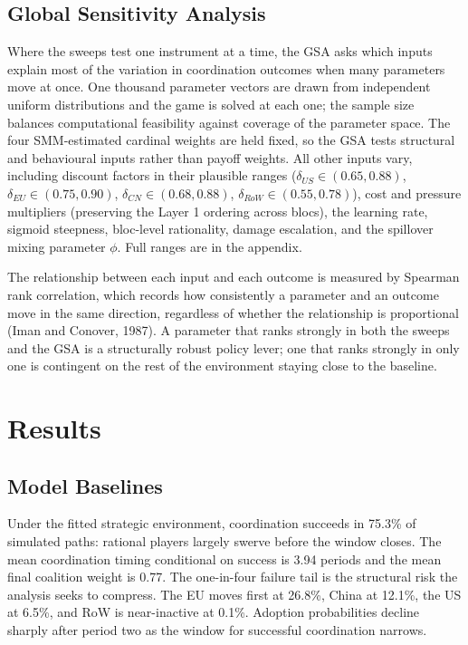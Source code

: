 \documentclass[10pt,a4paper]{article}
\begin{document}
\needspace{8em}
\subsection{Global Sensitivity Analysis}

Where the sweeps test one instrument at a time, the GSA asks which inputs explain most of the variation in coordination outcomes when many parameters move at once. One thousand parameter vectors are drawn from independent uniform distributions and the game is solved at each one; the sample size balances computational feasibility against coverage of the parameter space. The four SMM-estimated cardinal weights are held fixed, so the GSA tests structural and behavioural inputs rather than payoff weights. All other inputs vary, including discount factors in their plausible ranges ($\delta_{US} \in (0.65, 0.88)$, $\delta_{EU} \in (0.75, 0.90)$, $\delta_{CN} \in (0.68, 0.88)$, $\delta_{RoW} \in (0.55, 0.78)$), cost and pressure multipliers (preserving the Layer 1 ordering across blocs), the learning rate, sigmoid steepness, bloc-level rationality, damage escalation, and the spillover mixing parameter $\phi$. Full ranges are in the appendix.

The relationship between each input and each outcome is measured by Spearman rank correlation, which records how consistently a parameter and an outcome move in the same direction, regardless of whether the relationship is proportional (Iman and Conover, 1987). A parameter that ranks strongly in both the sweeps and the GSA is a structurally robust policy lever; one that ranks strongly in only one is contingent on the rest of the environment staying close to the baseline.

\clearpage
\needspace{12em}
\section{Results}

\needspace{12em}
\subsection{Model Baselines}

Under the fitted strategic environment, coordination succeeds in 75.3\% of simulated paths: rational players largely swerve before the window closes. The mean coordination timing conditional on success is 3.94 periods and the mean final coalition weight is 0.77. The one-in-four failure tail is the structural risk the analysis seeks to compress. The EU moves first at 26.8\%, China at 12.1\%, the US at 6.5\%, and RoW is near-inactive at 0.1\%. Adoption probabilities decline sharply after period two as the window for successful coordination narrows.
\end{document}

